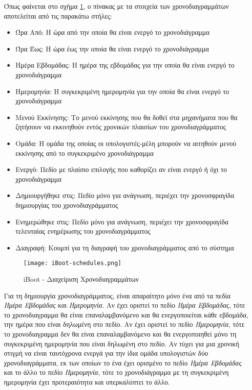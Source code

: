 Όπως φαίνεται στο σχήμα \ref{fig:iBoot_schedules}, ο πίνακας με τα στοιχεία των χρονοδιαγραμμάτων αποτελείται από τις παρακάτω στήλες:
\begin{itemize}
	\item Ώρα Από: Η ώρα από την οποία θα είναι ενεργό το χρονοδιάγραμμα
	\item Ώρα Έως: Η ώρα έως την οποία θα είναι ενεργό το χρονοδιάγραμμα
	\item Ημέρα Εβδομάδας: Η ημέρα της εβδομάδας για την οποία θα είναι ενεργό το χρονοδιάγραμμα
	\item Ημερομηνία: Η συγκεκριμένη ημερομηνία για την οποία θα είναι ενεργό το χρονοδιάγραμμα
	\item Μενού Εκκίνησης: Το μενού εκκίνησης που θα δοθεί στα μηχανήματα που θα ζητήσουν να εκκινηθούν εντός χρονικών πλαισίων του χρονοδιαγράμματος
	\item Ομάδα: Η ομάδα της οποίας οι υπολογιστές-μέλη μπορούν να αιτηθούν μενού εκκίνησης από το συγκεκριμένο χρονοδιάγραμμα
	\item Ενεργό: Πεδίο με πλαίσιο επιλογής που καθορίζει αν είναι ενεργό ή όχι το χρονοδιάγραμμα
	\item Δημιουργήθηκε στις: Πεδίο μόνο για ανάγνωση, περιέχει την χρονοσφραγίδα δημιουργίας του χρονοδιαγράμματος
	\item Ενημερώθηκε στις: Πεδίο μόνο για ανάγνωση, περιέχει την χρονοσφραγίδα τελευταίας ενημέρωσης του χρονοδιαγράμματος
	\item Διαγραφή: Κουμπί για τη διαγραφή του χρονοδιαγράμματος από το σύστημα
\end{itemize}

\begin{figure}[ht]
	\centering
	\texttt{[image: iBoot-schedules.png]}
	\caption{iBoot - Διαχείριση Χρονοδιαγραμμάτων}
	\label{fig:iBoot_schedules}
\end{figure}
Για τη δημιουργία χρονοδιαγράμματος, είναι απαραίτητο μόνο ένα από τα πεδία \emph{Ημέρα Εβδομάδας} και \emph{Ημερομηνία}. Αν έχει οριστεί το πεδίο \emph{Ημέρα Εβδομάδας}, τότε το χρονοδιαγραμμα θα είναι επαναλαμβανόμενο και θα ενεργοποιείται κάθε εβδομάδα, την ημέρα που είναι δηλωμένη στο πεδίο. Αν έχει οριστεί το πεδίο \emph{Ημερομηνία}, τότε το χρονοδιαγραμμα δεν θα είναι επαναλαμβανόμενο και θα ενεργοποιηθεί μόνο τη συγκεκριμένη ημερομηνία που είναι δηλωμένη στο πεδίο. Αν τύχει για μια χρονική στιγμή να είναι ταυτόχρονα ενεργά για την ίδια ομάδα υπολογιστών δύο χρονοδιαγράμματα, εκ των οποίων το ένα έχει ορισμένο το πεδίο \emph{Ημέρα Εβδομάδας} και το άλλο το πεδίο \emph{Ημερομηνία}, τότε το χρονοδιάγραμμα με τη συγκεκριμένη ημερομηνία έχει προτεραιότητα και υπερκαλύπτει το άλλο.
\FloatBarrier

